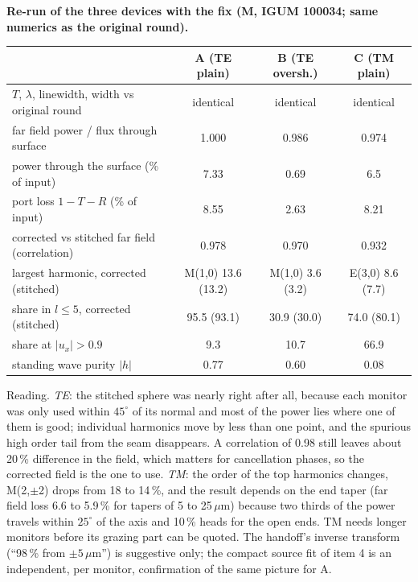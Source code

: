 \documentclass[11pt,a4paper]{article}
\begin{document}
\textbf{Re-run of the three devices with the fix (M, IGUM 100034; same numerics as the original round).}
\begin{center}\small\begin{tabular}{lccc}\hline
 & A (TE plain) & B (TE oversh.) & C (TM plain)\\\hline
$T$, $\lambda$, linewidth, width vs original round & identical & identical & identical\\
far field power / flux through surface & 1.000 & 0.986 & 0.974\\
power through the surface (\% of input) & 7.33 & 0.69 & 6.5\\
port loss $1-T-R$ (\% of input) & 8.55 & 2.63 & 8.21\\
corrected vs stitched far field (correlation) & 0.978 & 0.970 & 0.932\\
largest harmonic, corrected (stitched) & M(1,0) 13.6 (13.2) & M(1,0) 3.6 (3.2) & E(3,0) 8.6 (7.7)\\
share in $l\le5$, corrected (stitched) & 95.5 (93.1) & 30.9 (30.0) & 74.0 (80.1)\\
share at $|u_x|>0.9$ & 9.3 & 10.7 & 66.9\\
standing wave purity $|h|$ & 0.77 & 0.60 & 0.08\\\hline
\end{tabular}\end{center}
Reading. \emph{TE}: the stitched sphere was nearly right after all, because each monitor was only used within
$45^\circ$ of its normal and most of the power lies where one of them is good; individual harmonics move by less
than one point, and the spurious high order tail from the seam disappears. A correlation of 0.98 still leaves
about 20\,\% difference in the field, which matters for cancellation phases, so the corrected field is the one
to use. \emph{TM}: the order of the top harmonics changes, M(2,$\pm$2) drops from 18 to 14\,\%, and the result
depends on the end taper (far field loss 6.6 to 5.9\,\% for tapers of 5 to 25\,$\mu$m) because two thirds of
the power travels within $25^\circ$ of the axis and 10\,\% heads for the open ends. TM needs longer monitors
before its grazing part can be quoted. The handoff's inverse transform (``98\,\% from $\pm5$\,$\mu$m'') is suggestive only; the
compact source fit of item 4 is an independent, per monitor, confirmation of the same picture for A.
\end{document}
